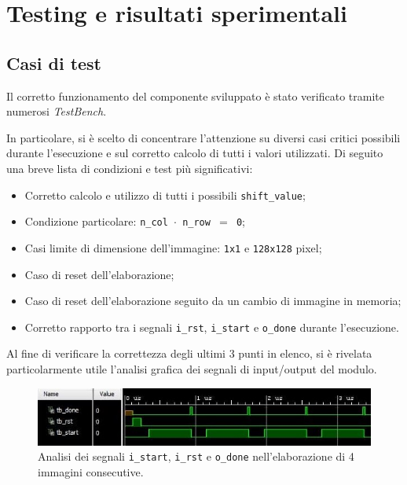 \documentclass{article}
\begin{document}
\section{Testing e risultati sperimentali} %
\subsection{Casi di test} %
Il corretto funzionamento del componente sviluppato è stato verificato tramite numerosi \emph{TestBench}.\par In particolare, si è scelto di concentrare l’attenzione su diversi casi critici possibili durante l’esecuzione e sul corretto calcolo di tutti i valori utilizzati. Di seguito una breve lista di condizioni e test più significativi:

\begin{itemize}
    \item   Corretto calcolo e utilizzo di tutti i possibili \texttt{shift\_value};
    \item   Condizione particolare: \texttt{n\_col $\cdot$ n\_row $=$ 0}\footnotemark ;
    \item   Casi limite di dimensione dell’immagine: \texttt{1x1} e \texttt{128x128} pixel;
    \item   Caso di reset dell’elaborazione;
    \item   Caso di reset dell’elaborazione seguito da un cambio di immagine in memoria;
    \item   Corretto rapporto tra i segnali \texttt{i\_rst}, \texttt{i\_start} e \texttt{o\_done} durante   l’esecuzione.
\end{itemize}

Al fine di verificare la correttezza degli ultimi 3 punti in elenco, si è rivelata particolarmente utile l'analisi grafica dei segnali di input/output del modulo.
\vspace{0,2cm}

\begin{figure}[ht]
    \centering
    \includegraphics[scale=0.9]{segnaliSignificativi.jpg}
    \caption{Analisi dei segnali \texttt{i\_start}, \texttt{i\_rst} e \texttt{o\_done} nell'elaborazione di 4 immagini consecutive.}
\end{figure}
\vspace{0,2cm}
\end{document}
